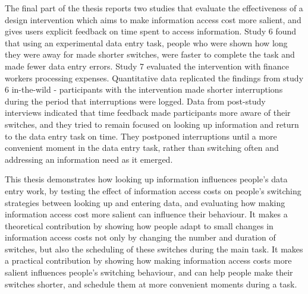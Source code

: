 
The final part of the thesis reports two studies that evaluate the effectiveness of a design intervention which aims to make information access cost more salient, and gives users explicit feedback on time spent to access information. Study 6 found that using an experimental data entry task, people who were shown how long they were away for made shorter switches, were faster to complete the task and made fewer data entry errors. Study 7 evaluated the intervention with finance workers processing expenses. Quantitative data replicated the findings from study 6 in-the-wild -  participants with the intervention made shorter interruptions during the period that interruptions were logged. Data from post-study interviews indicated that time feedback made participants more aware of their switches, and they tried to remain focused on looking up information and return to the data entry task on time. They postponed interruptions until a more convenient moment in the data entry task, rather than switching often and addressing an information need as it emerged. 


This thesis demonstrates how looking up information influences people's data entry work, by testing the effect of information access costs on people's switching strategies between looking up and entering data, and evaluating how making information access cost more salient can influence their behaviour. It makes a theoretical contribution by showing how people adapt to small changes in information access costs not only by changing the number and duration of switches, but also the scheduling of these switches during the main task. It makes a practical contribution by showing how making information access costs more salient influences people's switching behaviour, and can help people make their switches shorter, and schedule them at more convenient moments during a task.


